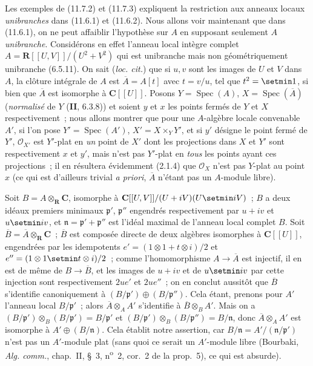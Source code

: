 \begin{env}[11.7.5]
Les exemples de (11.7.2) et (11.7.3) expliquent la restriction aux anneaux
locaux \emph{unibranches} dans (11.6.1) et (11.6.2). Nous allons voir maintenant
que dans (11.6.1), on ne peut affaiblir l'hypothèse sur $A$ en supposant
seulement $A$ \emph{unibranche}. Considérons en effet l'anneau local intègre complet
$A=\mathbf R[[U,V]]/(U^2+V^2)$ qui est unibranche mais non géométriquement
unibranche (6.5.11). On sait (\emph{loc. cit.}) que si $u,v$ sont les images de
$U$ et $V$ dans $A$, la clôture intégrale de $A$ est $\overline A=A[t]$ avec
$t=v/u$, tel que $t^2=\setmin 1$, si bien que $\overline A$ est isomorphe à
$\mathbf C[[U]]$. Posons $Y=\operatorname{Spec}(A)$,
$X=\operatorname{Spec}(\overline A)$ (\emph{normalisé} de $Y$ (\textbf{II}, 6.3.8)) et
soient $y$ et $x$ les points fermés de $Y$ et $X$ respectivement~; nous allons
montrer que pour une $A$-algèbre locale convenable $A'$, si l'on pose
$Y'=\operatorname{Spec}(A')$, $X'=X\times_Y Y'$, et si $y'$ désigne le point
fermé de $Y'$, $\mathcal O_{X'}$ est $Y'$-plat en \emph{un} point de $X'$ dont les
projections dans $X$ et $Y'$ sont respectivement $x$ et $y'$, mais n'est pas
$Y'$-plat en \emph{tous} les points ayant ces projections~; il en résultera évidemment
(2.1.4) que $\mathcal O_X$ n'est pas $Y$-plat au point $x$ (ce qui est d'ailleurs
trivial \emph{a priori}, $\overline A$ n'étant pas un $A$-module libre).

Soit $B=A\otimes_{\mathbf R}\mathbf C$, isomorphe à
$\mathbf C[[U,V]]/(U+iV)(U\setmin iV)$~; $B$ a deux idéaux premiers minimaux
$\mathfrak p'$, $\mathfrak p''$ engendrés respectivement par $u+iv$ et $u\setmin iv$,
et $\mathfrak n=\mathfrak p'+\mathfrak p''$ est l'idéal maximal de l'anneau
local complet $B$. Soit $\overline B=\overline A\otimes_{\mathbf R}\mathbf C$~;
$\overline B$ est composée directe de deux algèbres isomorphes à
$\mathbf C[[U]]$, engendrées par les idempotents
$e'=(1\otimes1+t\otimes i)/2$ et $e''=(1\otimes1\setmin t\otimes i)/2$~; comme
l'homomorphisme $A\to\overline A$ est injectif, il en est de même de
$B\to\overline B$, et les images de $u+iv$ et de $u\setmin iv$ par cette injection sont
respectivement $2ue'$ et $2ue''$~; on en conclut aussitôt que $\overline B$
s'identifie canoniquement à $(B/\mathfrak p')\oplus(B/\mathfrak p'')$. Cela
étant, prenons pour $A'$ l'anneau local $B/\mathfrak p'$~; alors
$\overline A\otimes_A A'$ s'identifie à $\overline B\otimes_B A'$. Mais on a
$(B/\mathfrak p')\otimes_B(B/\mathfrak p')=B/\mathfrak p'$ et
$(B/\mathfrak p')\otimes_B(B/\mathfrak p'')=B/\mathfrak n$, donc
$\overline A\otimes_A A'$ est isomorphe à $A'\oplus(B/\mathfrak n)$. Cela
établit notre assertion, car $B/\mathfrak n=A'/(\mathfrak n/\mathfrak p')$
n'est pas un $A'$-module plat (sans quoi ce serait un $A'$-module libre
(Bourbaki, \emph{Alg. comm.}, chap.~II, \S~3, n\textsuperscript{o}~2, cor.~2 de la
prop.~5), ce qui est absurde).
\end{env}

